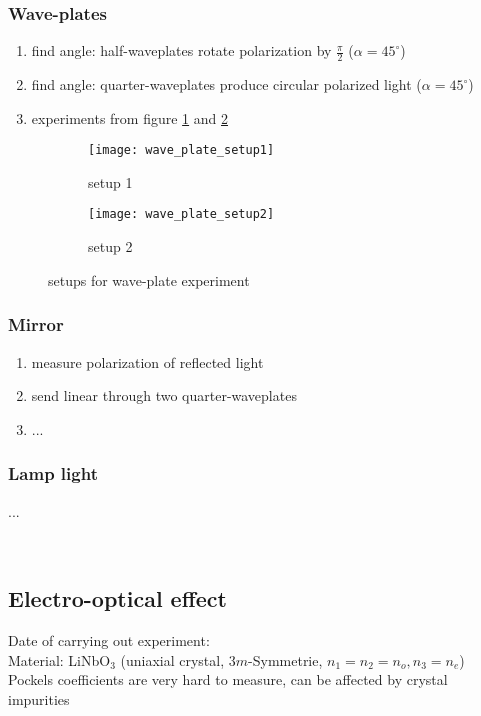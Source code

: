 \subsubsection{Wave-plates}
\begin{enumerate}
    \item find angle: half-waveplates rotate polarization by
    $\frac{\pi}{2}$ ($\alpha=45^\circ$)
    \item find angle: quarter-waveplates produce circular polarized
    light ($\alpha=45^\circ$)
    \item experiments from figure \ref{wave_plate_setup1} and
    \ref{wave_plate_setup2}
\end{enumerate}
\begin{figure}
\centering
\begin{subfigure}{.5\textwidth}
  \centering
  \texttt{[image: wave\_plate\_setup1]}
  \caption{setup 1}
  \label{wave_plate_setup1}
\end{subfigure}%
\begin{subfigure}{.5\textwidth}
  \centering
  \texttt{[image: wave\_plate\_setup2]}
  \caption{setup 2}
  \label{wave_plate_setup2}
\end{subfigure}
\caption{setups for wave-plate experiment}
\label{wave_plate_setup}
\end{figure}

\subsubsection{Mirror}
\begin{enumerate}
    \item measure polarization of reflected light
    \item send linear through two quarter-waveplates
    \item ...
\end{enumerate}

\subsubsection{Lamp light}
...

\newpage\ \newpage
\subsection{Electro-optical effect}
Date of carrying out experiment: \\
Material: LiNbO$_3$ (uniaxial crystal, $3m$-Symmetrie,
$n_1=n_2=n_o, n_3=n_e$)
\\ Pockels coefficients are very hard to measure, can be affected by crystal
impurities \\ \\

